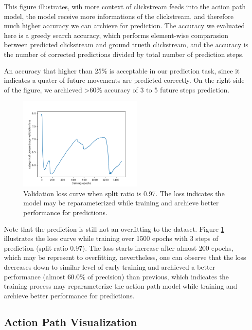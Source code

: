 This figure illustrates, wih more context of clickstream
feeds into the action path model, the model receive more informations of the clickstream, 
and therefore much higher accuracy we can archieve for prediction.
The accuracy we evaluated here is a greedy search accuracy, which performs element-wise comparasion
between predicted clickstream and ground trueth clickstream, and the accuracy is the number of
corrected predictions divided by total number of prediction steps.

An accuracy that higher than 25\% is acceptable in our prediction task, since it indicates
a quater of future movements are predicted correctly.
On the right side of the figure, we archieved >60\% accuracy of 3 to 5 future steps prediction.

\begin{figure}[H]
    \centering
    \includegraphics[width=0.55\textwidth]{figures/loss2}
    \caption{Validation loss curve when split ratio is 0.97. The loss indicates
    the model may be reparameterized while training and archieve better performance
    for predictions.}
    \label{fig:loss}
\end{figure}

Note that the prediction is still not an overfitting to the dataset. Figure \ref{fig:loss}
illustrates the loss curve while training over 1500 epochs with 3 steps of prediction (split ratio 0.97).
The loss starts increase after almost 200 epochs, which may be represent to overfitting,
nevertheless, one can observe that the loss decreases down to similar level of early training 
and archieved a better performance (almost 60.0\% of precision) than previous, which indicates
the training process may reparameterize the action path model while training and archieve better performance
for predictions.

\subsection{Action Path Visualization}

